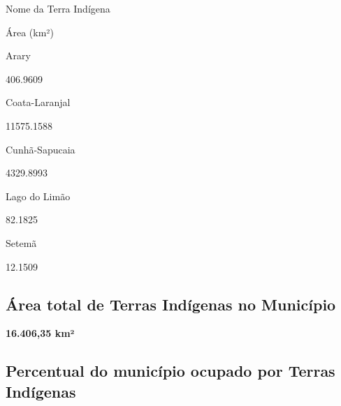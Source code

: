 \documentclass[
  letterpaper,
]{report}
\begin{document}
\n  

\n    

\n      

Nome da Terra Indígena

\n      

Área (km²)

\n    

\n  

\n  

\n    

\n      

Arary

\n      

406.9609

\n    

\n    

\n      

Coata-Laranjal

\n      

11575.1588

\n    

\n    

\n      

Cunhã-Sapucaia

\n      

4329.8993

\n    

\n    

\n      

Lago do Limão

\n      

82.1825

\n    

\n    

\n      

Setemã

\n      

12.1509

\n    

\n  

\n

\hypertarget{uxe1rea-total-de-terras-induxedgenas-no-municuxedpio-1}{%
\subsection{Área total de Terras Indígenas no
Município}\label{uxe1rea-total-de-terras-induxedgenas-no-municuxedpio-1}}

\textbf{16.406,35 km²}

\hypertarget{percentual-do-municuxedpio-ocupado-por-terras-induxedgenas-1}{%
\subsection{Percentual do município ocupado por Terras
Indígenas}\label{percentual-do-municuxedpio-ocupado-por-terras-induxedgenas-1}}
\end{document}
